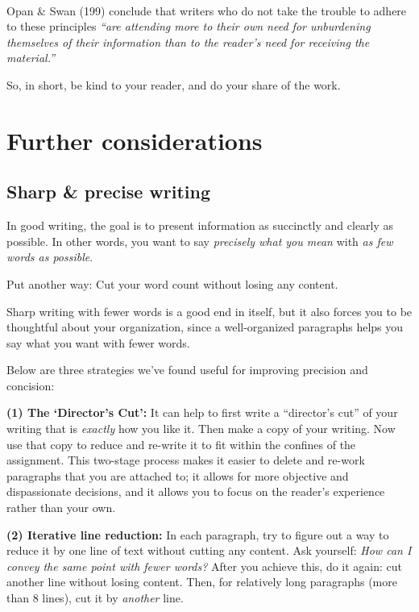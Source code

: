 \documentclass[
]{book}
\begin{document}
~

Opan \& Swan (199) conclude that writers who do not take the trouble to adhere to these principles \emph{``are attending more to their own need for unburdening themselves of their information than to the reader's need for receiving the material.''}

So, in short, be kind to your reader, and do your share of the work.

\hypertarget{further-considerations}{%
\section*{Further considerations}\label{further-considerations}}

\hypertarget{sharp-precise-writing}{%
\subsection*{Sharp \& precise writing}\label{sharp-precise-writing}}

In good writing, the goal is to present information as succinctly and clearly as possible. In other words, you want to say \emph{precisely what you mean} with \emph{as few words as possible}.

Put another way: Cut your word count without losing any content.

Sharp writing with fewer words is a good end in itself, but it also forces you to be thoughtful about your organization, since a well-organized paragraphs helps you say what you want with fewer words.

Below are three strategies we've found useful for improving precision and concision:

\textbf{(1) The `Director's Cut':} It can help to first write a ``director's cut'' of your writing that is \emph{exactly} how you like it. Then make a copy of your writing. Now use that copy to reduce and re-write it to fit within the confines of the assignment. This two-stage process makes it easier to delete and re-work paragraphs that you are attached to; it allows for more objective and dispassionate decisions, and it allows you to focus on the reader's experience rather than your own.

\textbf{(2) Iterative line reduction:} In each paragraph, try to figure out a way to reduce it by one line of text without cutting any content. Ask yourself: \emph{How can I convey the same point with fewer words?} After you achieve this, do it again: cut another line without losing content. Then, for relatively long paragraphs (more than 8 lines), cut it by \emph{another} line.
\end{document}
